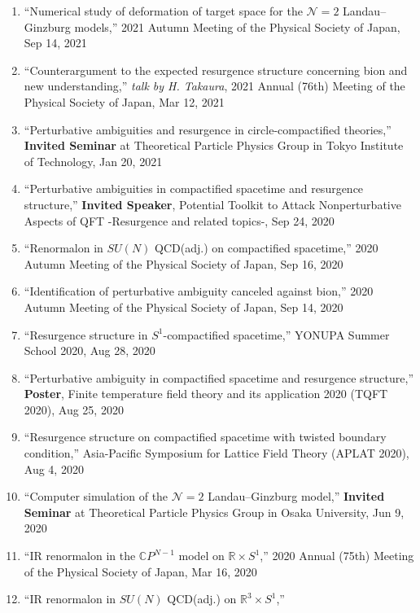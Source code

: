 \begin{enumerate}
       \textit{talk by M. Tanaka},
       2022 Annual (77th) Meeting of the Physical Society of Japan, Mar 15, 2022
 \item ``Numerical study of deformation of target space for the $\mathcal{N}=2$ Landau--Ginzburg models,''
       2021 Autumn Meeting of the Physical Society of Japan, Sep 14, 2021
 \item ``Counterargument to the expected resurgence structure concerning bion and new understanding,''
       \textit{talk by H. Takaura},
       2021 Annual (76th) Meeting of the Physical Society of Japan, Mar 12, 2021
 \item ``Perturbative ambiguities and resurgence in circle-compactified theories,''
       \textbf{Invited Seminar} at Theoretical Particle Physics Group in Tokyo Institute of Technology, Jan 20, 2021
 \item ``Perturbative ambiguities in compactified spacetime and resurgence structure,''
       \textbf{Invited Speaker}, Potential Toolkit to Attack Nonperturbative Aspects of QFT -Resurgence and related topics-, Sep 24, 2020
 \item ``Renormalon in $SU(N)$ QCD(adj.) on compactified spacetime,''
       2020 Autumn Meeting of the Physical Society of Japan, Sep 16, 2020
 \item ``Identification of perturbative ambiguity canceled against bion,''
       2020 Autumn Meeting of the Physical Society of Japan, Sep 14, 2020
 \item ``Resurgence structure in $S^1$-compactified spacetime,''
       YONUPA Summer School 2020, Aug 28, 2020
 \item ``Perturbative ambiguity in compactified spacetime and resurgence structure,''
       \textbf{Poster}, Finite temperature field theory and its application 2020 (TQFT 2020), Aug 25, 2020
 \item ``Resurgence structure on compactified spacetime with twisted boundary condition,''
       Asia-Pacific Symposium for Lattice Field Theory (APLAT 2020), Aug 4, 2020
 \item ``Computer simulation of the $\mathcal{N}=2$ Landau--Ginzburg model,''
       \textbf{Invited Seminar} at Theoretical Particle Physics Group in Osaka University, Jun 9, 2020
 \item ``IR renormalon in the $\mathbb{C}P^{N-1}$ model on $\mathbb{R}\times S^1$,''
       2020 Annual (75th) Meeting of the Physical Society of Japan, Mar 16, 2020
 \item ``IR renormalon in $SU(N)$ QCD(adj.) on $\mathbb{R}^3\times S^1$,''

\end{enumerate}
